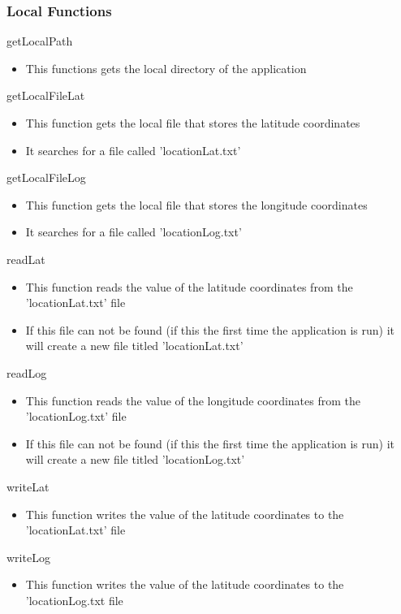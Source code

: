\documentclass[12pt, titlepage]{article}
\begin{document}
\subsubsection{Local Functions}

\noindent getLocalPath
\begin{itemize}
\item This functions gets the local directory of the application
\end{itemize}

\noindent getLocalFileLat
\begin{itemize}
\item This function gets the local file that stores the latitude coordinates
\item It searches for a file called 'locationLat.txt'
\end{itemize}

\noindent getLocalFileLog
\begin{itemize}
\item This function gets the local file that stores the longitude coordinates
\item It searches for a file called 'locationLog.txt'
\end{itemize}

\noindent readLat
\begin{itemize}
\item This function reads the value of the latitude coordinates from the 'locationLat.txt' file
\item If this file can not be found (if this the first time the application is run) it will create a new file titled 'locationLat.txt'
\end{itemize}

\noindent readLog
\begin{itemize}
\item This function reads the value of the longitude coordinates from the 'locationLog.txt' file
\item If this file can not be found (if this the first time the application is run) it will create a new file titled 'locationLog.txt'
\end{itemize}

\noindent writeLat
\begin{itemize}
\item This function writes the value of the latitude coordinates to the 'locationLat.txt' file
\end{itemize}

\noindent writeLog
\begin{itemize}
\item This function writes the value of the latitude coordinates to the 'locationLog.txt file
\end{itemize}
\end{document}
